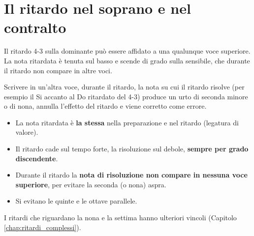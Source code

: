 \section{Il ritardo nel soprano e nel contralto}
\label{sec:ritardo_4_3_voci}

Il ritardo 4-3 sulla dominante può essere affidato a una qualunque voce superiore. La nota ritardata è tenuta sul basso e scende di grado sulla sensibile, che durante il ritardo non compare in altre voci.

\begin{esempio}
	\label{ex:ritardo_4_3_a}
\end{esempio}

\begin{errore}
	\label{err:ritardo_risoluzione}
	Scrivere in un'altra voce, durante il ritardo, la nota su cui il ritardo risolve (per esempio il Si accanto al Do ritardato del 4-3) produce un urto di seconda minore o di nona, annulla l'effetto del ritardo e viene corretto come errore.
\end{errore}

\begin{regola}
	\label{reg:condotta_ritardo_base}
	\begin{itemize}
		\item La nota ritardata è \textbf{la stessa} nella preparazione e nel ritardo (legatura di valore).
		\item Il ritardo cade sul tempo forte, la risoluzione sul debole, \textbf{sempre per grado discendente}.
		\item Durante il ritardo la \textbf{nota di risoluzione non compare in nessuna voce superiore}, per evitare la seconda (o nona) aspra.
		\item Si evitano le quinte e le ottave parallele.
	\end{itemize}
	I ritardi che riguardano la nona e la settima hanno ulteriori vincoli (Capitolo \ref{chap:ritardi_complessi}).
\end{regola}
